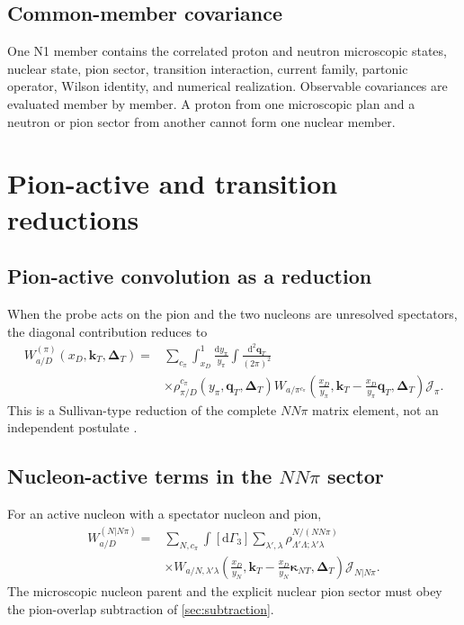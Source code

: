 \documentclass[11pt]{article}
\newcommand{\kT}{\bm{k}_{T}}
\newcommand{\qT}{\bm{q}_{T}}
\newcommand{\DT}{\bm{\Delta}_{T}}
\newcommand{\dd}{\mathrm{d}}
\newcommand{\cJ}{\mathcal J}
\begin{document}
\subsection{Common-member covariance}

One N1 member contains the correlated proton and neutron microscopic states,
nuclear state, pion sector, transition interaction, current family, partonic
operator, Wilson identity, and numerical realization.  Observable
covariances are evaluated member by member.  A proton from one microscopic
plan and a neutron or pion sector from another cannot form one nuclear member.

\section{Pion-active and transition reductions}
\label{sec:pion-reductions}

\subsection{Pion-active convolution as a reduction}

When the probe acts on the pion and the two nucleons are unresolved
spectators, the diagonal contribution reduces to
\begin{equation}
 \begin{aligned}
 W_{a/D}^{(\pi)}(x_D,\kT,\DT)
 ={}&
 \sum_{c_\pi}
 \int_{x_D}^{1}\frac{\dd y_\pi}{y_\pi}
 \int\frac{\dd^2\qT}{(2\pi)^2}
 \\
 &\times
 \rho_{\pi/D}^{c_\pi}
 (y_\pi,\qT,\DT)
 W_{a/\pi^{c_\pi}}
 \left(
 \frac{x_D}{y_\pi},
 \kT-\frac{x_D}{y_\pi}\qT,
 \DT
 \right)
 \cJ_{\pi}.
 \end{aligned}
 \label{eq:pion-convolution}
\end{equation}
This is a Sullivan-type reduction of the complete \(NN\pi\) matrix element,
not an independent postulate \cite{Sullivan1972,Miller2014}.

\subsection{Nucleon-active terms in the \texorpdfstring{\(NN\pi\)}{NNpi} sector}

For an active nucleon with a spectator nucleon and pion,
\begin{equation}
 \begin{aligned}
 W_{a/D}^{(N|N\pi)}
 ={}&
 \sum_{N,c_\pi}
 \int[\dd\Gamma_3]
 \sum_{\lambda',\lambda}
 \rho_{\Lambda'\Lambda;\lambda'\lambda}^{N/(NN\pi)}
 \\
 &\times
 W_{a/N,\lambda'\lambda}
 \left(
 \frac{x_D}{y_N},
 \kT-\frac{x_D}{y_N}\bm\kappa_{NT},
 \DT
 \right)
 \cJ_{N|N\pi}.
 \end{aligned}
 \label{eq:nucleon-active-nnpi}
\end{equation}
The microscopic nucleon parent and the explicit nuclear pion sector must obey
the pion-overlap subtraction of \cref{sec:subtraction}.
\end{document}
